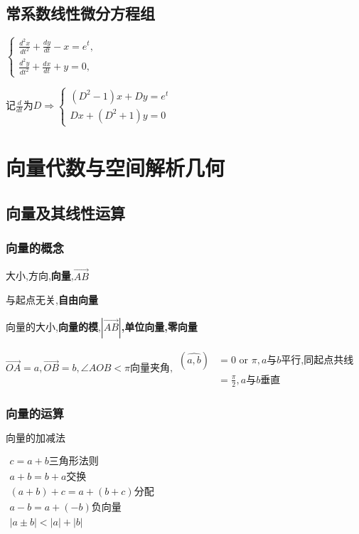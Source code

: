 \documentclass[UTF8]{ctexart}
\newcommand{\mt}[1]{\text{#1}}
\newcommand{\mb}[1]{\textbf{#1}}
\newcommand{\mf}[1]{\left( #1\right)}
\newcommand{\mfa}[1]{\left| #1\right|}
\newcommand{\mha}[1]{\overrightarrow{#1}}
\newcommand{\p}{\par}
\newcommand{\ma}[1]{\begin{array}{llll} #1 \end{array}}
\begin{document}
\subsection{常系数线性微分方程组}


$\left\{\begin{array}{l}
    \frac{d^2x}{dt^2}+\frac{dy}{dt}-x=e^t,\\
    \frac{d^2y}{dt^2}+\frac{dx}{dt}+y=0,
\end{array}\right.
$\par
$\text{记}\frac{d}{dt}\text{为}D\Rightarrow
\left\{\begin{array}{l}
    \left(D^2-1\right)x+Dy=e^t\\
    Dx+\left(D^2+1\right)y=0
\end{array}\right.
$



\newpage


\section{向量代数与空间解析几何}

\subsection{向量及其线性运算}
\setcounter{page}{1}
\subsubsection{向量的概念}
大小,方向,\mb{向量},$\mha{AB}$\p
与起点无关,\mb{自由向量}\p
向量的大小,\mb{向量的模},$\mfa{\mha{AB}}$\mb{,单位向量,零向量}\p

$\mha{OA}=a,\mha{OB}=b,\angle AOB < \pi \mt{向量夹角},\ma{
    \mf{\widehat{a,b}} & =0  \mt{ or }  \pi,a\mt{与}b\mt{平行,同起点共线}\\
     & =\frac{\pi}{2},a\mt{与}b\mt{垂直}
}$

\subsubsection{向量的运算}

$\mb{向量的加减法}$\p
$\ma{c=a+b\mt{三角形法则}\\
    a+b=b+a\mt{交换}\\
    \mf{a+b}+c=a+\mf{b+c}\mt{分配}\\
    a-b=a+\mf{-b}\mt{负向量}\\
    \mfa{a \pm b}<\mfa{a}+\mfa{b}
}$\p
\end{document}
